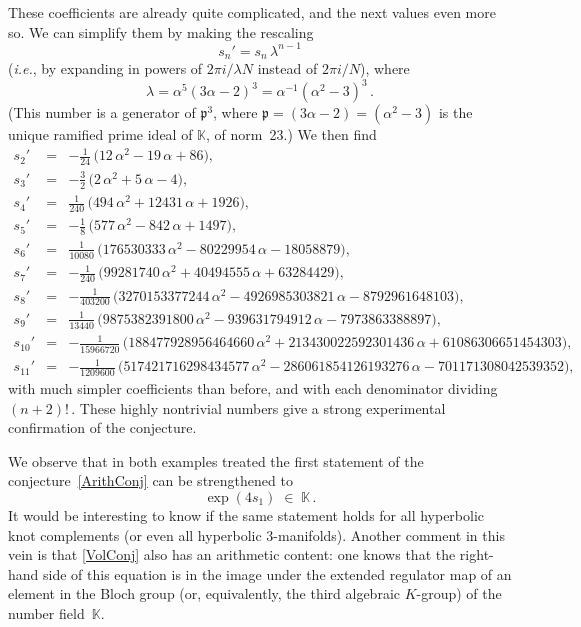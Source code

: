 \documentclass[hyper]{JHEP3}
\newcommand\be{\begin{equation}}
\newcommand\ee{\end{equation}}
\newcommand{\beas}{\begin{eqnarray*}}
\newcommand{\eeas}{\end{eqnarray*}}
\def\a{\alpha}
\begin{document}
These coefficients are already quite complicated, and the next values even more so.
We can simplify them by making the rescaling
\be s_n'=s_n\,\lambda^{n-1} \ee
({\it i.e.}, by expanding in powers of $2\pi i/\lambda N$ instead of $2\pi i/N$), where
\be\lambda=\a^5(3\a-2)^3=\a^{-1}(\a^2-3)^3\,.\ee
(This number is a generator of $\mathfrak p^3$, where $\mathfrak p =(3\a-2)=(\a^2-3)$ is the unique
ramified prime ideal of $\mathbb K$, of norm~23.) We then find
\beas s_2' &=& -\tfrac1{24}\,\bigl(12\,\a^2-19\,\a+86\bigr),   \\
 s_3' &=&  - \tfrac32\,\bigl(2\,\a^2+5\,\a-4\bigr),     \\
 s_4' &=&   \tfrac1{240}\,\bigl(494\,\a^2+12431\,\a+1926\bigr),     \\
 s_5' &=&   -\tfrac18\,\bigl(577\,\a^2-842\,\a+1497\bigr),     \\
 s_6' &=&  \tfrac1{10080}\,\bigl(176530333\,\a^2-80229954\,\a-18058879\bigr),      \\
 s_7' &=&  -  \tfrac1{240}\,\bigl(99281740\,\a^2+40494555\,\a+63284429\bigr), \\
 s_8' &=&  -\tfrac1{403200}\,\bigl(3270153377244\,\a^2-4926985303821\,\a-8792961648103\bigr), \\
 s_9' &=&   \tfrac1{13440}\,\bigl(9875382391800\,\a^2 - 939631794912\,\a - 7973863388897\bigr), \\
 s_{10}' &=&  - \tfrac1{15966720}\,\bigl(188477928956464660\,\a^2+213430022592301436\,\a+61086306651454303\bigr), \\
 s_{11}' &=& -\tfrac1{1209600}\,\bigl(517421716298434577\,\a^2-286061854126193276\,\a-701171308042539352\bigr),  \eeas
with much simpler coefficients than before, and with each denominator dividing $(n+2)!\,$.
These highly nontrivial numbers give a strong experimental confirmation of the conjecture.

We observe that in both examples treated the first statement of the conjecture~\eqref{ArithConj} can
be strengthened to
\be \exp(4s_1)\;\in\;\mathbb K\,. \ee
It would be interesting to know if the same statement holds for all hyperbolic knot complements (or
even all hyperbolic 3-manifolds). Another comment in this vein is that \eqref{VolConj} also has an
arithmetic content: one knows that the right-hand side of this equation is in the image under the
extended regulator map of an element in the Bloch group (or, equivalently, the third algebraic $K$-group)
of the number field~$\mathbb K$.


\end{document}
